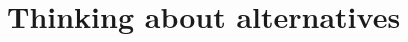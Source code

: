 \documentclass[paper=6in:9in,pagesize=pdftex,
 headinclude=off,footinclude=on,11pt,twoside]{scrbook}
\begin{document}
\chapter{Thinking about alternatives}

\clearpage
%
%
%
%
%
%
%
%
%
%
%
%
%
%
%
%
%
%
\end{document}
